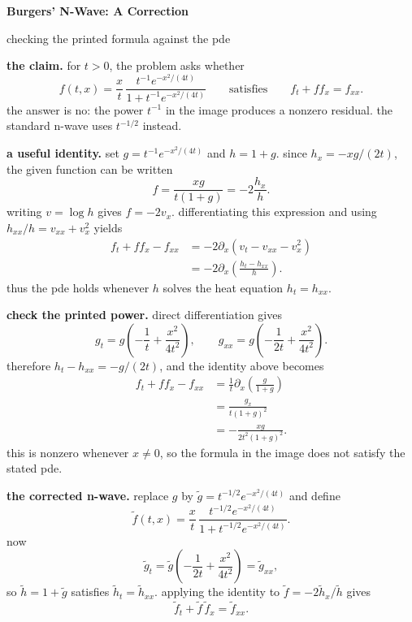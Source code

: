 \documentclass[11pt]{article}
\begin{document}
\begin{center}
{\LARGE\bfseries Burgers' N-Wave: A Correction}\par
{\large checking the printed formula against the pde}\par
\end{center}

\textbf{the claim.} for $t>0$, the problem asks whether
\[
f(t,x)=\frac{x}{t}\,
\frac{t^{-1}e^{-x^{2}/(4t)}}{1+t^{-1}e^{-x^{2}/(4t)}}
\qquad\text{satisfies}\qquad
f_t+ff_x=f_{xx}.
\]
the answer is no: the power $t^{-1}$ in the image produces a nonzero residual. the standard n-wave uses $t^{-1/2}$ instead.

\textbf{a useful identity.} set $g=t^{-1}e^{-x^{2}/(4t)}$ and $h=1+g$. since $h_x=-xg/(2t)$, the given function can be written
\[
f=\frac{xg}{t(1+g)}=-2\frac{h_x}{h}.
\]
writing $v=\log h$ gives $f=-2v_x$. differentiating this expression and using $h_{xx}/h=v_{xx}+v_x^2$ yields
\begin{align*}
f_t+ff_x-f_{xx}
&=-2\partial_x\!\left(v_t-v_{xx}-v_x^2\right)\\
&=-2\partial_x\!\left(\frac{h_t-h_{xx}}{h}\right).
\end{align*}
thus the pde holds whenever $h$ solves the heat equation $h_t=h_{xx}$.

\textbf{check the printed power.} direct differentiation gives
\[
g_t=g\left(-\frac1t+\frac{x^2}{4t^2}\right),
\qquad
g_{xx}=g\left(-\frac1{2t}+\frac{x^2}{4t^2}\right).
\]
therefore $h_t-h_{xx}=-g/(2t)$, and the identity above becomes
\begin{align*}
f_t+ff_x-f_{xx}
&=\frac1t\partial_x\!\left(\frac{g}{1+g}\right)\\
&=\frac{g_x}{t(1+g)^2}\\
&=\boxed{-\frac{xg}{2t^2(1+g)^2}}.
\end{align*}
this is nonzero whenever $x\ne0$, so the formula in the image does not satisfy the stated pde.

\textbf{the corrected n-wave.} replace $g$ by $\widetilde g=t^{-1/2}e^{-x^{2}/(4t)}$ and define
\[
\widetilde f(t,x)=\frac{x}{t}\,
\frac{t^{-1/2}e^{-x^{2}/(4t)}}{1+t^{-1/2}e^{-x^{2}/(4t)}}.
\]
now
\[
\widetilde g_t
=\widetilde g\left(-\frac1{2t}+\frac{x^2}{4t^2}\right)
=\widetilde g_{xx},
\]
so $\widetilde h=1+\widetilde g$ satisfies $\widetilde h_t=\widetilde h_{xx}$. applying the identity to $\widetilde f=-2\widetilde h_x/\widetilde h$ gives
\[
\boxed{\widetilde f_t+\widetilde f\,\widetilde f_x=\widetilde f_{xx}}.
\]
\end{document}
